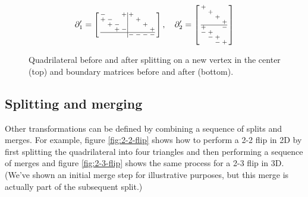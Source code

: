 \documentclass[twocolumn]{article}
\makeatletter
\newenvironment{smallarray}[1]
 {\null\,\vcenter\bgroup\scriptsize
  \renewcommand{\arraystretch}{0.7}%
  \arraycolsep=.13885em
  \hbox\bgroup$\array{@{}#1@{}}}
 {\endarray$\egroup\egroup\,\null}
\makeatother
\begin{document}
\begin{figure}[h]
    \begin{equation*}
        \partial_1' = \left[\begin{smallarray}{cccc|cccc}
            - &   &   & + & + &   &   &   \\
            + & - &   &   &   & + &   &   \\
              & + & - &   &   &   & + &   \\
              &   & + & - &   &   &   & + \\
            \hline
              &   &   &   & - & - & - & -
        \end{smallarray}\right], \quad
        \partial_2' = \left[\begin{smallarray}{cccc}
            + &   &   &   \\
              & + &   &   \\
              &   & + &   \\
              &   &   & + \\
            \hline
            + &   &   & - \\
            - & + &   &   \\
              & - & + &   \\
              &   & - & +
        \end{smallarray}\right]
    \end{equation*}

    \caption{Quadrilateral before and after splitting on a new vertex in the center (top) and boundary matrices before and after (bottom).}
    \label{fig:split-transformation}
\end{figure}

\subsection{Splitting and merging}

Other transformations can be defined by combining a sequence of splits and merges.
For example, figure \ref{fig:2-2-flip} shows how to perform a 2-2 flip in 2D by first splitting the quadrilateral into four triangles and then performing a sequence of merges and figure \ref{fig:2-3-flip} shows the same process for a 2-3 flip in 3D.
(We've shown an initial merge step for illustrative purposes, but this merge is actually part of the subsequent split.)
\end{document}
